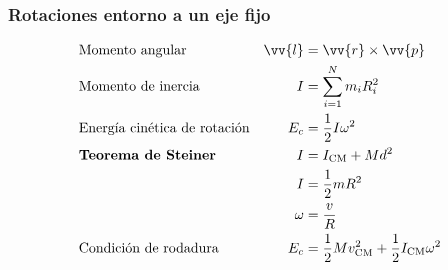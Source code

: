 \documentclass[a4paper, 8pt]{extarticle}
\renewcommand{\vec}[1]{\vv{{#1}}}
\begin{document}
\begin{multicols}{3}
  \subsubsection{Rotaciones entorno a un eje fijo}
  \begin{align*}
     & \text{Momento angular}              & \vec{l} & = \vec{r} \times \vec{p}                                          \\
     & \text{Momento de inercia}           & I       & = \sum_{i=1}^{N} m_i R_i^2                                        \\
     & \text{Energía cinética de rotación} & E_c     & = \frac{1}{2} I \omega ^2                                         \\
     & \textbf{Teorema de Steiner}         & I       & = I_{\text{CM}} + Md^2                                            \\
     &                                     & I       & = \frac{1}{2}mR^2                                                 \\
     &                                     & \omega  & = \frac{v}{R}                                                     \\
     & \text{Condición de rodadura}        & E_c     & = \frac{1}{2}M v_{\text{CM}}^2 + \frac{1}{2}I_{\text{CM}}\omega^2
  \end{align*}


\end{multicols}
\end{document}
